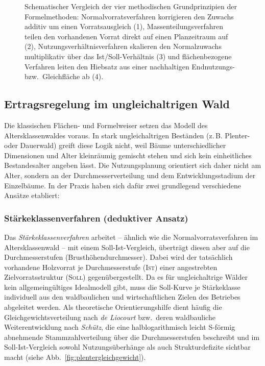 \documentclass[twocolumn, paper=a4, fontsize=10pt]{scrartcl}
\begin{document}
\begin{figure}[!htbp]
{%
  }
  \caption{Schematischer Vergleich der vier methodischen Grundprinzipien der Formelmethoden: Normalvorratsverfahren korrigieren den Zuwachs additiv um einen Vorratsausgleich (1), Massenteilungsverfahren teilen den vorhandenen Vorrat direkt auf einen Planzeitraum auf (2), Nutzungsverhältnisverfahren skalieren den Normalzuwachs multiplikativ über das Ist/Soll-Verhältnis (3) und flächenbezogene Verfahren leiten den Hiebsatz aus einer nachhaltigen Endnutzungs- bzw.\ Gleichfläche ab (4).}
  \label{fig:formelmethoden_schema}
\end{figure}

\subsection{Ertragsregelung im ungleichaltrigen Wald}

Die klassischen Flächen- und Formelweiser setzen das Modell des Altersklassenwaldes voraus. In stark ungleichaltrigen Beständen (z.\,B. Plenter- oder Dauerwald) greift diese Logik nicht, weil Bäume unterschiedlicher Dimensionen und Alter kleinräumig gemischt stehen und sich kein einheitliches Bestandesalter angeben lässt. Die Nutzungsplanung orientiert sich daher nicht am Alter, sondern an der Durchmesserverteilung und dem Entwicklungsstadium der Einzelbäume. In der Praxis haben sich dafür zwei grundlegend verschiedene Ansätze etabliert:

\subsubsection{Stärkeklassenverfahren (deduktiver Ansatz)}

Das \emph{Stärkeklassenverfahren} arbeitet -- ähnlich wie die Normalvorratsverfahren im Altersklassenwald -- mit einem Soll-Ist-Vergleich, überträgt diesen aber auf die Durchmesserstufen (Brusthöhendurchmesser). Dabei wird der tatsächlich vorhandene Holzvorrat je Durchmesserstufe (\textsc{Ist}) einer angestrebten Zielvorratsstruktur (\textsc{Soll}) gegenübergestellt. Da es für ungleichaltrige Wälder kein allgemeingültiges Idealmodell gibt, muss die Soll-Kurve je Stärkeklasse individuell aus den waldbaulichen und wirtschaftlichen Zielen des Betriebes abgeleitet werden. Als theoretische Orientierungshilfe dient häufig die Gleichgewichtsverteilung nach \emph{de Liocourt} bzw.\ deren waldbauliche Weiterentwicklung nach \emph{Schütz}, die eine halblogarithmisch leicht S-förmig abnehmende Stammzahlverteilung über die Durchmesserstufen beschreibt und im Soll-Ist-Vergleich sowohl Nutzungsüberhänge als auch Strukturdefizite sichtbar macht (siehe Abb.~\ref{fig:plentergleichgewicht}).
\end{document}
